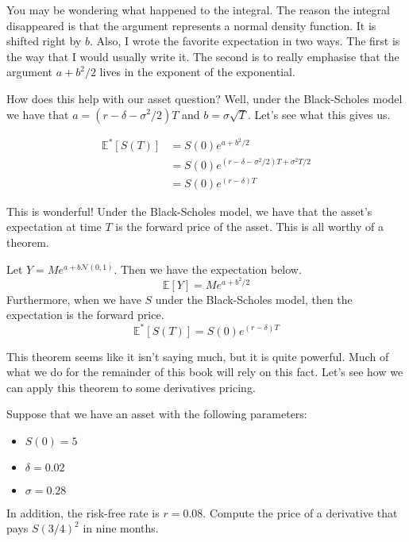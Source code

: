 \documentclass{ximera}
\begin{document}
You may be wondering what happened to the integral. The reason the integral disappeared is that the argument represents a normal density function. It is shifted right by $b$. Also, I wrote the favorite expectation in two ways. The first is the way that I would usually write it. The second is to really emphasise that the argument $a+b^2/2$ lives in the exponent of the exponential.

How does this help with our asset question? Well, under the Black-Scholes model we have that $a=(r-\delta-\sigma^2/2)T$ and $b=\sigma\sqrt{T}$. Let's see what this gives us.

\begin{align*}
\mathbb{E}^*[S(T)] 	&=S(0)e^{a+b^2/2}\\
				&=S(0)e^{(r-\delta-\sigma^2/2)T+\sigma^2T/2}\\
				&=S(0)e^{(r-\delta)T}
\end{align*}

This is wonderful! Under the Black-Scholes model, we have that the asset's expectation at time $T$ is the forward price of the asset. This is all worthy of a theorem.

\begin{theorem}
Let $Y=Me^{a+b\mathcal{N}(0,1)}$. Then we have the expectation below.
	\begin{equation*}
	\mathbb{E}[Y]=Me^{a+b^2/2}
	\end{equation*}
Furthermore, when we have $S$ under the Black-Scholes model, then the expectation is the forward price.
	\begin{equation*}
	\mathbb{E}^*[S(T)]=S(0)e^{(r-\delta)T}
	\end{equation*}
\end{theorem}

This theorem seems like it isn't saying much, but it is quite powerful. Much of what we do for the remainder of this book will rely on this fact. Let's see how we can apply this theorem to some derivatives pricing.

\begin{example}
Suppose that we have an asset with the following parameters:

	\begin{itemize}
	\item $S(0)=5$
	\item $\delta=0.02$
	\item $\sigma=0.28$
	\end{itemize}

In addition, the risk-free rate is $r=0.08$. Compute the price of a derivative that pays $S(3/4)^2$ in nine months.
\end{example}
\end{document}
